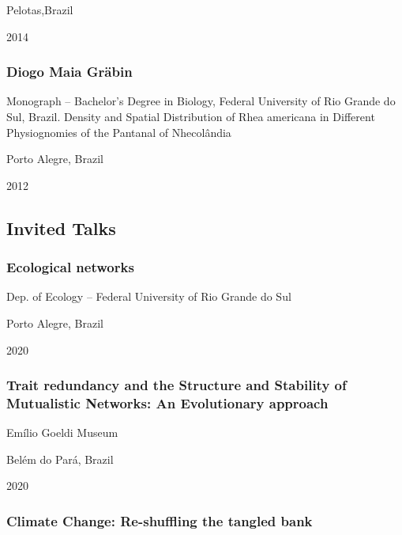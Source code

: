 \documentclass[
]{article}
\begin{document}
Pelotas,Brazil

2014

\hypertarget{diogo-maia-gruxe4bin}{%
\subsubsection{Diogo Maia Gräbin}\label{diogo-maia-gruxe4bin}}

Monograph -- Bachelor's Degree in Biology, Federal University of Rio
Grande do Sul, Brazil. Density and Spatial Distribution of Rhea
americana in Different Physiognomies of the Pantanal of Nhecolândia

Porto Alegre, Brazil

2012

\hypertarget{invited-talks}{%
\subsection{Invited Talks}\label{invited-talks}}

\hypertarget{ecological-networks}{%
\subsubsection{Ecological networks}\label{ecological-networks}}

Dep. of Ecology -- Federal University of Rio Grande do Sul

Porto Alegre, Brazil

2020

\hypertarget{trait-redundancy-and-the-structure-and-stability-of-mutualistic-networks-an-evolutionary-approach}{%
\subsubsection{Trait redundancy and the Structure and Stability of
Mutualistic Networks: An Evolutionary
approach}\label{trait-redundancy-and-the-structure-and-stability-of-mutualistic-networks-an-evolutionary-approach}}

Emílio Goeldi Museum

Belém do Pará, Brazil

2020

\hypertarget{climate-change-re-shuffling-the-tangled-bank}{%
\subsubsection{Climate Change: Re-shuffling the tangled
bank}\label{climate-change-re-shuffling-the-tangled-bank}}
\end{document}
